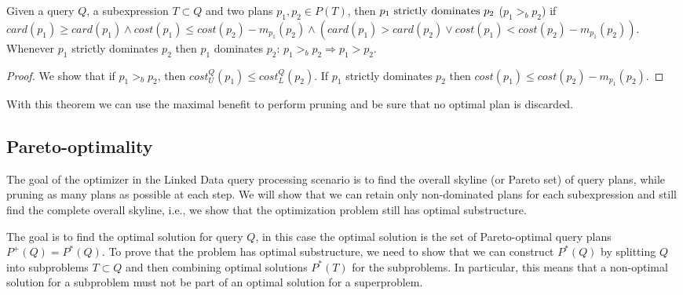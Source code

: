 \begin{theorem}
  Given a query $Q$, a subexpression $T \subset Q$ and two plans
  $p_1,p_2 \in P(T)$, then $p_1 \mbox{\textnormal{ strictly dominates
    }} p_2$ ($p_1 >_b p_2$) if $card(p_1) \geq card(p_1) \wedge
  cost(p_1) \leq cost(p_2) - m_{p_1}(p_2) \wedge (card(p_1) >
  card(p_2) \vee cost(p_1) < cost(p_2) - m_{p_1}(p_2))$.  Whenever
  $p_1$ strictly dominates $p_2$ then $p_1$ dominates $p_2$: $p_1 >_b
  p_2 \Rightarrow p_1 > p_2$.
\end{theorem}
\begin{proof}
  We show that if $p_1 >_b p_2$, then $cost^Q_U(p_1) \leq
  cost^Q_L(p_2)$. If $p_1$ strictly dominates $p_2$ then $cost(p_1)
  \leq cost(p_2) - m_{p_1}(p_2)$.
\end{proof}

With this theorem we can use the maximal benefit to perform pruning
and be sure that no optimal plan is discarded.

\subsection{Pareto-optimality}
\label{sec:pareto}

The goal of the optimizer in the Linked Data query processing scenario
is to find the overall skyline (or Pareto set) of query plans, while
pruning as many plans as possible at each step. We will show that we
can retain only non-dominated plans for each subexpression and still
find the complete overall skyline, i.e., we show that the optimization
problem still has optimal substructure.

The goal is to find the optimal solution for query $Q$, in this case
the optimal solution is the set of Pareto-optimal query plans $P^+(Q)
= P^*(Q)$. To prove that the problem has optimal substructure, we need
to show that we can construct $P^*(Q)$ by splitting $Q$ into
subproblems $T \subset Q$ and then combining optimal solutions
$P^*(T)$ for the subproblems. In particular, this means that a
non-optimal solution for a subproblem must not be part of an optimal
solution for a superproblem.



